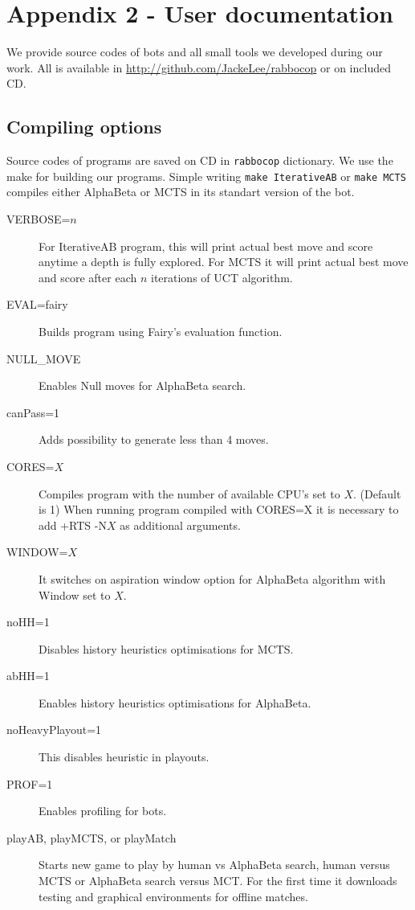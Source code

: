 \chapter{Appendix 2 - User documentation}
We provide source codes of bots and all small tools we developed during our
work. All is available in \url{http://github.com/JackeLee/rabbocop} or on
included CD.

\section{Compiling options}
Source codes of programs are saved on CD in \texttt{rabbocop} dictionary.
We use the make for building our programs. Simple writing \texttt{make
IterativeAB} or \texttt{make MCTS} compiles either AlphaBeta or MCTS in its
standart version of the bot.


\begin{description}
\item[VERBOSE=$n$]{
	For IterativeAB program, this will print actual best move and score anytime
	a depth is fully explored.
	For MCTS it will print actual best move and score after each $n$ iterations of
	UCT algorithm.
	}

\item[EVAL=fairy]{
	Builds program using Fairy's evaluation function.}

\item[NULL\_MOVE]{
	Enables Null moves for AlphaBeta search.}

\item[canPass=1]{
	Adds possibility to generate less than 4 moves.}

\item[CORES=$X$]{
	Compiles program with the number of available CPU's set to $X$. (Default is 1)
	When running program compiled with CORES=X it is necessary to add +RTS -N$X$
	as additional arguments.}

\item[WINDOW=$X$]{
	It switches on aspiration window option for AlphaBeta algorithm with Window
	set to $X$.}

\item[noHH=1]{
	Disables history heuristics optimisations for MCTS.}

\item[abHH=1]{
	Enables history heuristics optimisations for AlphaBeta.}

\item[noHeavyPlayout=1]{
	This disables heuristic in playouts.}

\item[PROF=1]{
	Enables profiling for bots.}

\item[playAB, playMCTS, or playMatch]{
	Starts new game to play by human vs AlphaBeta search, human versus MCTS or
	AlphaBeta search versus MCT.
	For the first time it downloads testing and graphical environments for
	offline matches.
	}
\end{description}
